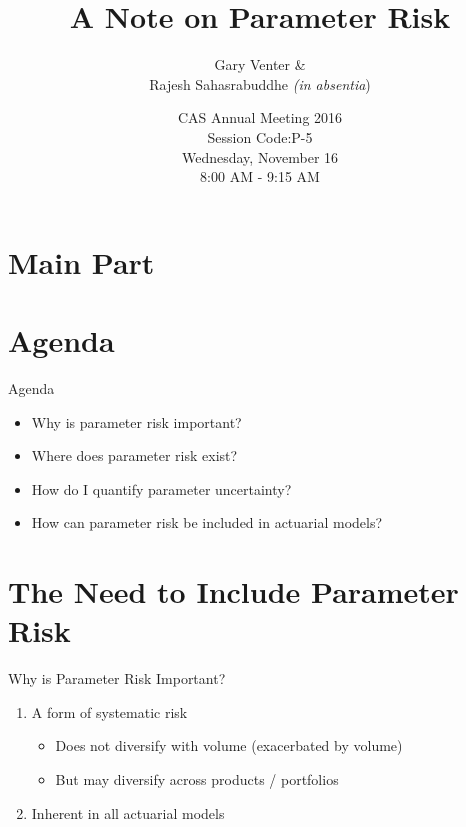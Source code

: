 \documentclass[10pt, xcolor=x11names, compress, handout]{beamer}
\title{A Note on Parameter Risk}
\subtitle{Gary Venter \& \\
	Rajesh Sahasrabuddhe \textit{(in absentia})}
\date{
	CAS Annual Meeting 2016\\
	Session Code:P-5\\
	Wednesday, November 16\\
	8:00 AM - 9:15 AM	
	}
\begin{document}
\section{Main Part}
\begin{frame}
\maketitle
\end{frame}

\section{Agenda}
\begin{frame}{Agenda}
\begin{itemize}
	\item<1-> Why is parameter risk important?
	\item<2-> Where does parameter risk exist?
	\item<3-> How do I quantify parameter uncertainty?
	\item<4-> How can parameter risk be included in actuarial models?		
\end{itemize}
\end{frame}

\section{The Need to Include Parameter Risk}
\begin{frame}{Why is Parameter Risk Important?}
	\begin{enumerate}
		\item<1-> A form of systematic risk
		\begin{itemize}
			\item<2-> Does not diversify with volume (exacerbated by volume)
			\item<2-> But may diversify across products / portfolios
		\end{itemize}
		\item<3-> Inherent in all actuarial models		
	\end{enumerate}
\end{frame}
\end{document}
